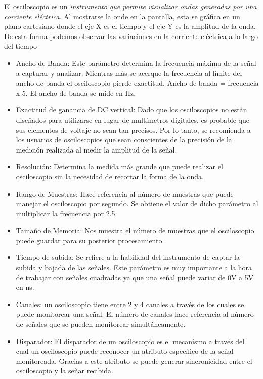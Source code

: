 \documentclass[10pt]{article}
\begin{document}
El osciloscopio es un \textit{instrumento que permite visualizar ondas generadas por una corriente eléctrica}. Al mostrarse la onde en la pantalla, esta se gráfica en un plano cartesiano donde el eje X es el tiempo y el eje Y es la amplitud de la onda. De esta forma podemos observar las variaciones en la corriente eléctrica a lo largo del tiempo

\begin{itemize}
	\item Ancho de Banda: Este parámetro determina la frecuencia máxima de la señal a capturar y analizar. Mientras más se acerque la frecuencia al límite del ancho de banda el osciloscopio pierde exactitud. Ancho de banda = frecuencia x 5. El ancho de banda se mide en Hz.
	\item Exactitud de ganancia de DC vertical:  Dado que los osciloscopios no están diseñados para utilizarse en lugar de multímetros digitales, es probable que sus elementos de voltaje no sean tan precisos. Por lo tanto, se recomienda a los usuarios de osciloscopios que sean conscientes de la precisión de la medición realizada al medir la amplitud de la señal.
	\item Resolución: Determina la medida más grande que puede realizar el osciloscopio sin la necesidad de recortar la forma de la onda.
	\item Rango de Muestras: Hace referencia al número de muestras que puede manejar el osciloscopio por segundo. Se obtiene el valor de dicho parámetro al multiplicar la frecuencia por 2.5
	\item Tamaño de Memoria: Nos muestra el número de muestras que el osciloscopio puede guardar para su posterior procesamiento.
	\item Tiempo de subida: Se refiere a la habilidad del instrumento de captar la subida y bajada de las señales. Este parámetro es muy importante a la hora de trabajar con señales cuadradas ya que una señal puede variar de 0V a 5V en ns.
	\item Canales: un osciloscopio tiene entre 2 y 4 canales a través de los cuales se puede monitorear una señal. El número de canales hace referencia al número de señales que se pueden monitorear simultáneamente.
	\item Disparador: El disparador de un osciloscopio es el mecanismo a través del cual un osciloscopio puede reconocer un atributo específico de la señal monitoreada. Gracias a este atributo se puede generar sincronicidad entre el osciloscopio y la señar recibida.
\end{itemize}
\end{document}
